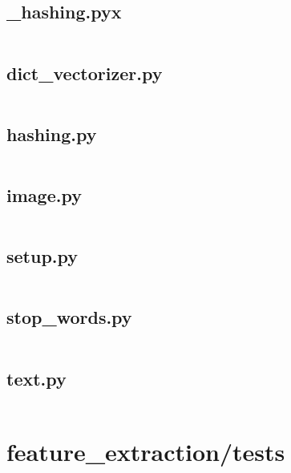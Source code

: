 \documentclass{article}
\begin{document}
\subsection{\_hashing.pyx}
\inputminted{cython}{/home/dufferzafar/dev/@clones/scikit-learn/sklearn/feature_extraction/_hashing.pyx}
\newpage

\subsection{dict\_vectorizer.py}
\inputminted{python}{/home/dufferzafar/dev/@clones/scikit-learn/sklearn/feature_extraction/dict_vectorizer.py}
\newpage

\subsection{hashing.py}
\inputminted{python}{/home/dufferzafar/dev/@clones/scikit-learn/sklearn/feature_extraction/hashing.py}
\newpage

\subsection{image.py}
\inputminted{python}{/home/dufferzafar/dev/@clones/scikit-learn/sklearn/feature_extraction/image.py}
\newpage

\subsection{setup.py}
\inputminted{python}{/home/dufferzafar/dev/@clones/scikit-learn/sklearn/feature_extraction/setup.py}
\newpage

\subsection{stop\_words.py}
\inputminted{python}{/home/dufferzafar/dev/@clones/scikit-learn/sklearn/feature_extraction/stop_words.py}
\newpage

\subsection{text.py}
\inputminted{python}{/home/dufferzafar/dev/@clones/scikit-learn/sklearn/feature_extraction/text.py}
\newpage

\section{feature\_extraction/tests}
\end{document}
